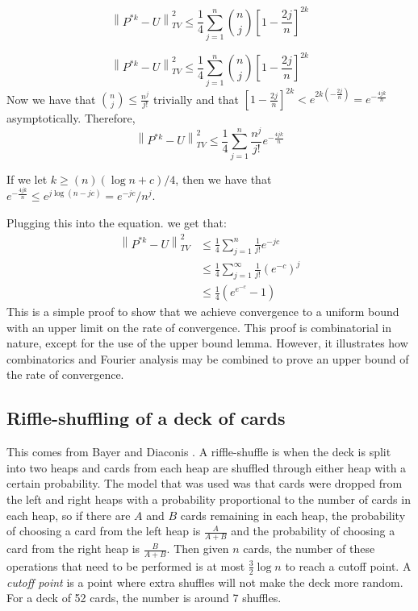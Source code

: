 \documentclass[]{article}
\theoremstyle{definition}
\numberwithin{theorem}{section}
\numberwithin{equation}{section}
\begin{document}
\begin{equation}
	\left\| P^{\ast k} - U \right\|_{TV}^2 \leq \frac{1}{4} \sum_{j = 1}^{n}\binom{n}{j} \left[1 - \frac{2j}{n}\right]^{2k}
\end{equation}

\begin{equation}
	\left\| P^{\ast k} - U \right\|_{TV}^2 \leq \frac{1}{4} \sum_{j = 1}^{n}\binom{n}{j} \left[1 - \frac{2j}{n}\right]^{2k}
\end{equation}
Now we have that $\binom{n}{j} \leq \frac{n^j}{j!}$ trivially and that $\left[1 - \frac{2j}{n}\right]^{2k} < e^{2k(- \frac{2j}{n})} = e^{-\frac{4jk}{n}}$ asymptotically. 
Therefore, 
\begin{equation}
	\left\| P^{\ast k} - U \right\|_{TV}^2 \leq \frac{1}{4} \sum_{j = 1}^{n}\frac{n^j}{j!} e^{-\frac{4jk}{n}}
\end{equation}

If we let $k \geq (n)(\log n + c)/4$, then we have that $e^{-\frac{4jk}{n}} \leq e^{j \log (n - jc)}= e^{- j c}/ n^j$.

Plugging this into the equation. we get that:
\begin{align*}
	\left\| P^{\ast k} - U \right\|_{TV}^2 &\leq \frac{1}{4} \sum_{j = 1}^{n}\frac{1}{j!}e^{-jc}\\	
	&\leq \frac{1}{4}\sum_{j = 1}^{\infty}\frac{1}{j!}\left(e^{-c}\right)^j\\
	&\leq \frac{1}{4}\left(e^{e^{-c}} - 1\right)
\end{align*}
This is a simple proof to show that we achieve convergence to a uniform bound with an upper limit on the rate of convergence. This proof is combinatorial in nature, except for the use of the upper bound lemma. However, it illustrates how combinatorics and Fourier analysis may be combined to prove an upper bound of the rate of convergence.

	\subsection{Riffle-shuffling of a deck of cards}This comes from Bayer and Diaconis \cite{bayerTrailingDovetailShuffle1992}. A riffle-shuffle is when the deck is split into two heaps and cards from each heap are shuffled through either heap with a certain probability. The model that was used was that cards were dropped from the left and right heaps with a probability proportional to the number of cards in each heap, so if there are $A$ and $B$ cards remaining in each heap, the probability of choosing a card from the left heap is $\frac{A}{A + B}$ and the probability of choosing a card from the right heap is $\frac{B}{A + B}$. Then given $n$ cards, the number of these operations that need to be performed is at most $\frac{3}{2} \log n$ to reach a cutoff point. A \textit{cutoff point} is a point where extra shuffles will not make the deck more random. For a deck of 52 cards, the number is around 7 shuffles. 
\end{document}
